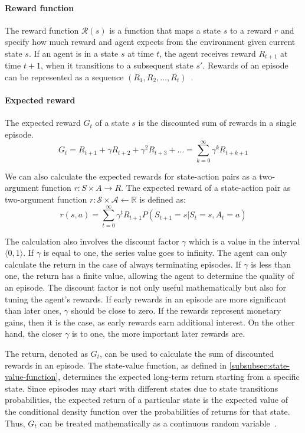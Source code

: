 \documentclass[../xlapes02]{subfiles}
\begin{document}
    \paragraph{Reward function}
    The reward function $\mathcal{R}(s)$ is a function that maps a state $s$ to a reward $r$ and specify how much reward and agent expects from the environment given current state $s$. If an agent is in a state $s$ at time $t$, the agent receives reward  $R_{t+1}$  at time $t + 1$,  when it transitions to a subsequent state $s'$. Rewards of an episode can be represented as a sequence $(R_1, R_2, \ldots, R_t)$~\cite{FITMT25127}.

    \paragraph{Expected reward}
    The expected reward $G_t$ of a state $s$ is the discounted sum of rewards in a single episode.
    \begin{equation}
        G_t = R_{t+1} + \gamma R_{t+2} + \gamma^2 R_{t+3} + \ldots = \sum_{k=0}^{\infty} \gamma^k R_{t+k+1}
    \end{equation}

    We can also calculate the expected rewards for state-action pairs as a two-argument function $r: S \times A \to R$.
    The expected reward of a state-action pair as two-argument function $r: \mathcal{S}\times \mathcal{A}\leftarrow \mathbb{R}$ is defined as:
    \begin{equation}
        r(s, a) = \sum_{t=0}^{\infty} \gamma^t R_{t+1} P(S_{t+1} = s|S_t = s, A_t = a)
    \end{equation}

    The calculation also involves the discount factor $\gamma$ which is a value in the interval $\langle 0, 1 \rangle$. If $\gamma$ is equal to one, the series value goes to infinity. The agent can only calculate the return in the case of always terminating episodes. If $\gamma$ is less than one, the return has a finite value, allowing the agent to determine the quality of an episode. The discount factor is not only useful mathematically but also for tuning the agent's rewards. If early rewards in an episode are more significant than later ones, $\gamma$ should be close to zero. If the rewards represent monetary gains, then it is the case, as early rewards earn additional interest. On the other hand, the closer $\gamma$ is to one, the more important later rewards are.

    The return, denoted as $G_t$, can be used to calculate the sum of discounted rewards in an episode. The state-value function, as defined in \cref{subsubsec:state-value-function}, determines the expected long-term return starting from a specific state. Since episodes may start with different states due to state transitions probabilities, the expected return of a particular state is the expected value of the conditional density function over the probabilities of returns for that state. Thus, $G_t$ can be treated mathematically as a continuous random variable~\cite{FITMT25127, rao2022foundations}.
\end{document}
